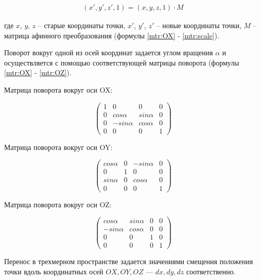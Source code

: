 \begin{equation}
	\label{mtr:affineTransform}
	\begin{gathered}
		(x', y', z', 1) = (x, y, z, 1) \cdot M
	\end{gathered}
\end{equation}

где $x$, $y$, $z$ -- старые координаты точки, $x'$, $y'$, $z'$ -- новые координаты точки, $M$ -- матрица афинного преобразования (формулы \ref{mtr:OX} - \ref{mtr:scale}).

Поворот вокруг одной из осей координат задается углом вращения $\alpha$ и осуществляется с помощью соответствующей матрицы поворота (формулы \ref{mtr:OX} - \ref{mtr:OZ}).

Матрица поворота вокруг оси OX:

\begin{equation}
	\label{mtr:OX}
	\begin{pmatrix}
		1 	& 0 		  & 0 	       & 0 \\
		0 	& cos \alpha  & sin \alpha & 0 \\
		0	& -sin \alpha & cos \alpha & 0 \\
		0 	& 0 		  & 0          & 1
	\end{pmatrix}
\end{equation}

Матрица поворота вокруг оси OY:

\begin{equation}
	\label{mtr:OY}
	\begin{pmatrix}
		cos \alpha 	& 0 & -sin \alpha & 0 \\
		0 			& 1 & 0 		  & 0 \\
		sin \alpha	& 0 & cos \alpha  & 0 \\
		0 			& 0 & 0           & 1
	\end{pmatrix}
\end{equation}

Матрица поворота вокруг оси OZ:

\begin{equation}
	\label{mtr:OZ}
	\begin{pmatrix}
		cos \alpha 	 & sin \alpha & 0 & 0 \\
		-sin \alpha  & cos \alpha & 0 & 0 \\
		0	 		 & 0		  & 1 & 0 \\
		0 			 & 0 		  & 0 & 1
	\end{pmatrix}
\end{equation}

Перенос в трехмерном пространстве задается значениями смещения положения точки вдоль координатных осей $OX, OY, OZ$ --- $dx, dy, dz$ соответственно.

